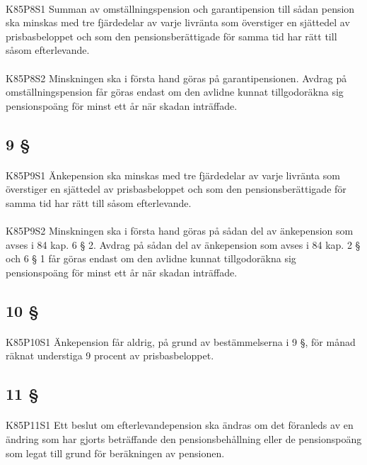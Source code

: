 \documentclass[a4paper,notitlepage,openany,10pt]{book}
\begin{document}
\paragraph*{}
{\tiny K85P8S1}
Summan av omställningspension och garantipension till sådan pension ska minskas med tre fjärdedelar av varje livränta som överstiger en sjättedel av prisbasbeloppet och som den pensionsberättigade för samma tid har rätt till såsom efterlevande.
\paragraph*{}
{\tiny K85P8S2}
Minskningen ska i första hand göras på garantipensionen.
Avdrag på omställningspension får göras endast om den avlidne kunnat tillgodoräkna sig pensionspoäng för minst ett år när skadan inträffade.
\subsection*{9 §}
\paragraph*{}
{\tiny K85P9S1}
Änkepension ska minskas med tre fjärdedelar av varje livränta som överstiger en sjättedel av prisbasbeloppet och som den pensionsberättigade för samma tid har rätt till såsom efterlevande.
\paragraph*{}
{\tiny K85P9S2}
Minskningen ska i första hand göras på sådan del av änkepension som avses i 84 kap. 6 § 2. Avdrag på sådan del av änkepension som avses i 84 kap. 2 § och 6 § 1 får göras endast om den avlidne kunnat tillgodoräkna sig pensionspoäng för minst ett år när skadan inträffade.
\subsection*{10 §}
\paragraph*{}
{\tiny K85P10S1}
Änkepension får aldrig, på grund av bestämmelserna i 9 §, för månad räknat understiga 9 procent av prisbasbeloppet.
\subsection*{11 §}
\paragraph*{}
{\tiny K85P11S1}
Ett beslut om efterlevandepension ska ändras om det föranleds av en ändring som har gjorts beträffande den pensionsbehållning eller de pensionspoäng som legat till grund för beräkningen av pensionen.
\end{document}
